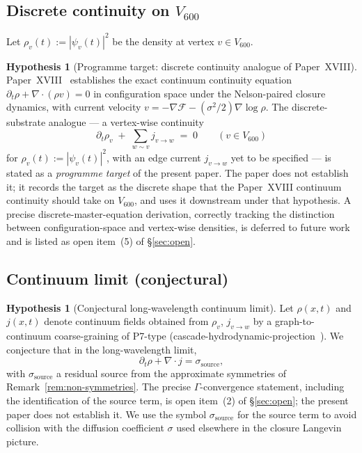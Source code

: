 \documentclass[11pt]{article}
\theoremstyle{definition}
\newtheorem{hypothesis}[theorem]{Hypothesis}
\newcommand{\Fcal}{\mathcal{F}}
\begin{document}
\subsection{Discrete continuity on $V_{600}$}

Let $\rho_v(t) := |\psi_v(t)|^2$ be the density at vertex $v \in V_{600}$.

\begin{hypothesis}[Programme target: discrete continuity analogue of Paper~XVIII]\label{thm:continuity-discrete}
Paper~XVIII~\citep{SmartXVIII} establishes the exact continuum continuity equation $\partial_t \rho + \nabla\cdot(\rho v) = 0$ in configuration space under the Nelson-paired closure dynamics, with current velocity $v = -\nabla\Fcal - (\sigma^2/2)\nabla\log\rho$. The discrete-substrate analogue --- a vertex-wise continuity
\begin{equation}\label{eq:continuity}
    \partial_t \rho_v \;+\; \sum_{w \sim v} j_{v \to w} \;=\; 0
    \qquad (v \in V_{600})
\end{equation}
for $\rho_v(t) := |\psi_v(t)|^2$, with an edge current $j_{v \to w}$ yet to be specified --- is stated as a \emph{programme target} of the present paper. The paper does not establish it; it records the target as the discrete shape that the Paper~XVIII continuum continuity should take on $V_{600}$, and uses it downstream under that hypothesis. A precise discrete-master-equation derivation, correctly tracking the distinction between configuration-space and vertex-wise densities, is deferred to future work and is listed as open item~(5) of \S\ref{sec:open}.
\end{hypothesis}

\subsection{Continuum limit (conjectural)}

\begin{hypothesis}[Conjectural long-wavelength continuum limit]\label{prop:continuum}
Let $\rho(x, t)$ and $j(x, t)$ denote continuum fields obtained from $\rho_v$, $j_{v \to w}$ by a graph-to-continuum coarse-graining of P7-type (cascade-hydrodynamic-projection~\citep{CascadeHydro}). We conjecture that in the long-wavelength limit,
\begin{equation}
    \partial_t \rho + \nabla \cdot j = \sigma_{\text{source}},
\end{equation}
with $\sigma_{\text{source}}$ a residual source from the approximate symmetries of Remark~\ref{rem:non-symmetries}. The precise $\Gamma$-convergence statement, including the identification of the source term, is open item~(2) of \S\ref{sec:open}; the present paper does not establish it. We use the symbol $\sigma_{\text{source}}$ for the source term to avoid collision with the diffusion coefficient $\sigma$ used elsewhere in the closure Langevin picture.
\end{hypothesis}
\end{document}
